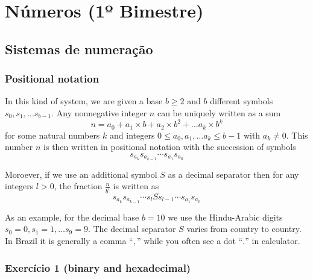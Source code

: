 \chapter{Números (1º Bimestre)}

\section{Sistemas de numeração}

\subsection*{Positional notation}

In this kind of system, we are given a base $b \geq 2$ and $b$ different symbols
$s_0, s_1, \ldots s_{b-1}$. Any nonnegative integer $n$ can be uniquely written
as a sum
$$
n = a_0 + {a_1 \times b} + {a_2 \times b^2} + \ldots
{a_k \times b^k}
$$
for some natural numbers $k$ and integers $0 \leq a_0, a_1, \ldots a_k \leq b-1$
with $a_k \neq 0$. This number $n$ is then written in positional notation
with the succession of symbols
$$s_{a_k}s_{a_{k-1}} \cdots s_{a_1}s_{a_0}$$

Moroever, if we use an additional symbol $S$ as a decimal separator then
for any integers $l > 0$, the fraction $\frac{n}{b^l}$ is written as
$$s_{a_k}s_{a_{k-1}} \cdots s_{l} S s_{l-1} \cdots s_{a_1}s_{a_0}$$

As an example, for the decimal base $b=10$ we use the
Hindu-Arabic digits $s_0 = 0, s_1 = 1, \ldots s_9 = 9$.
The decimal separator $S$
varies from country to country. In Brazil it is generally a comma ``$,$'' while
you often see a dot ``$.$'' in calculator.

\subsection*{Exercício 1 (binary and hexadecimal)}

